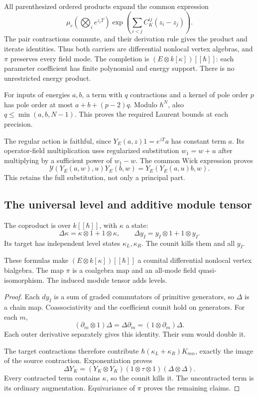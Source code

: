 All parenthesized ordered products expand the common expression
\[
 \mu_r\left(\bigotimes_i e^{z_iT}\right)
 \exp\left(\sum_{i<j}C_K^{ij}(z_i-z_j)\right).
\]
The pair contractions commute, and their derivation rule
gives the product and iterate identities.
Thus both carriers are differential nonlocal vertex algebras,
and $\pi$ preserves every field mode.
The completion is
$(E\otimes k[\kappa])[[\hbar]]$: each parameter coefficient
has finite polynomial and energy support.
There is no unrestricted energy product.

For inputs of energies $a,b$, a term with $q$ contractions
and a kernel of pole order $p$ has pole order at most
$a+b+(p-2)q$. Modulo $\hbar^N$, also
$q\leq\min(a,b,N-1)$.
This proves the required Laurent bounds at each precision.

The regular action is faithful, since
$Y_E(a,z)1=e^{zT}a$ has constant term $a$.
Its operator-field multiplication uses regularized
substitution $w_1=w+u$ after multiplying by a sufficient
power of $w_1-w$. The common Wick expression proves
\[
 \mathcal Y(Y_E(a,w),u)Y_E(b,w)=Y_E(Y_E(a,u)b,w).
\]
This retains the full substitution, not only a principal part.

\subsection{The universal level and additive module tensor}

The coproduct is over $k[[\hbar]]$, with $\kappa$ a state:
\[
 \Delta\kappa=\kappa\otimes1+1\otimes\kappa,\qquad
 \Delta y_I=y_I\otimes1+1\otimes y_I.
\]
Its target has independent level states $\kappa_L,\kappa_R$.
The counit kills them and all $y_I$.

\begin{proposition}
\label{v4-arith:centers:prop:universal-level}
These formulas make $(E\otimes k[\kappa])[[\hbar]]$
a counital differential nonlocal vertex bialgebra.
The map $\pi$ is a coalgebra map and an all-mode field
quasi-isomorphism. The induced module tensor adds levels.
\end{proposition}

\begin{proof}
Each $dy_I$ is a sum of graded commutators of primitive
generators, so $\Delta$ is a chain map.
Coassociativity and the coefficient counit hold on generators.
For each $m$,
\[
 (\partial_m\otimes1)\Delta
 =\Delta\partial_m=(1\otimes\partial_m)\Delta.
\]
Each outer derivative separately gives this identity.
Their sum would double it.

The target contractions therefore contribute
$\hbar(\kappa_L+\kappa_R)K_{mn}$, exactly the image
of the source contraction. Exponentiation proves
\[
 \Delta Y_K
 =(Y_K\otimes Y_K)(1\otimes\tau\otimes1)(\Delta\otimes\Delta).
\]
Every contracted term contains $\kappa$, so the counit
kills it. The uncontracted term is its ordinary augmentation.
Equivariance of $\pi$ proves the remaining claims.
\end{proof}

